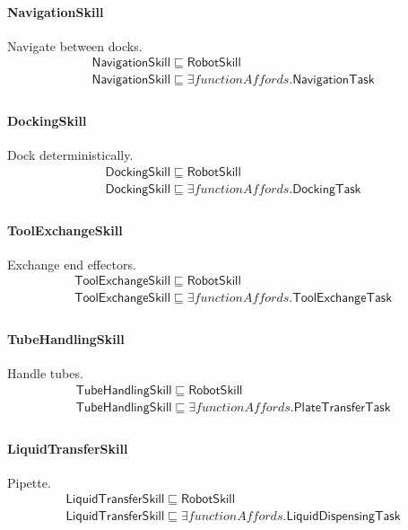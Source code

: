 \documentclass[10pt]{article}
\begin{document}
\paragraph{NavigationSkill} Navigate between docks.
\[\begin{array}{l}
\mathsf{NavigationSkill} \sqsubseteq  \mathsf{RobotSkill} \\
\mathsf{NavigationSkill} \sqsubseteq  \exists \mathit{functionAffords}.\mathsf{NavigationTask} \\
\end{array}\]
\paragraph{DockingSkill} Dock deterministically.
\[\begin{array}{l}
\mathsf{DockingSkill} \sqsubseteq  \mathsf{RobotSkill} \\
\mathsf{DockingSkill} \sqsubseteq  \exists \mathit{functionAffords}.\mathsf{DockingTask} \\
\end{array}\]
\paragraph{ToolExchangeSkill} Exchange end effectors.
\[\begin{array}{l}
\mathsf{ToolExchangeSkill} \sqsubseteq  \mathsf{RobotSkill} \\
\mathsf{ToolExchangeSkill} \sqsubseteq  \exists \mathit{functionAffords}.\mathsf{ToolExchangeTask} \\
\end{array}\]
\paragraph{TubeHandlingSkill} Handle tubes.
\[\begin{array}{l}
\mathsf{TubeHandlingSkill} \sqsubseteq  \mathsf{RobotSkill} \\
\mathsf{TubeHandlingSkill} \sqsubseteq  \exists \mathit{functionAffords}.\mathsf{PlateTransferTask} \\
\end{array}\]
\paragraph{LiquidTransferSkill} Pipette.
\[\begin{array}{l}
\mathsf{LiquidTransferSkill} \sqsubseteq  \mathsf{RobotSkill} \\
\mathsf{LiquidTransferSkill} \sqsubseteq  \exists \mathit{functionAffords}.\mathsf{LiquidDispensingTask} \\
\end{array}\]
\end{document}
